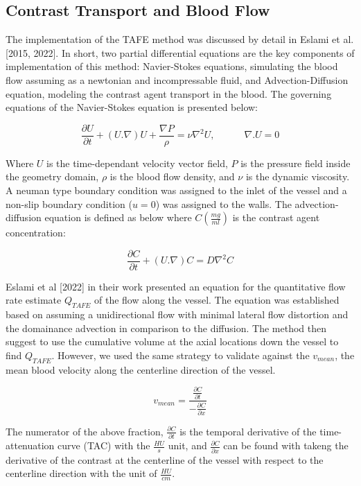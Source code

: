 \documentclass[times,twocolumn,final]{elsarticle}
\begin{document}
\subsection{Contrast Transport and Blood Flow}
The implementation of the TAFE method was discussed by detail in Eslami et al. [2015, 2022]. In short, two partial differential equations are the key components of implementation of this method: Navier-Stokes equations, simulating the blood flow assuming as a newtonian and incompressable fluid, and Advection-Diffusion equation, modeling the contrast agent transport in the blood. The governing equations of the Navier-Stokes equation is presented below:

\begin{equation}
\dfrac{\partial U}{\partial t} + (U. \nabla)U + \dfrac{\nabla P}{\rho} = \nu \nabla^2U,\quad \quad \quad \nabla.U=0
\end{equation}

Where $U$ is the time-dependant velocity vector field, $P$ is the pressure field inside the geometry domain, $\rho$ is the blood flow density, and $\nu$ is the dynamic viscosity. A neuman type boundary condition was assigned to the inlet of the vessel and a non-slip boundary condition ($u=0$) was assigned to the walls. The advection-diffusion equation is defined as below where $C(\frac{mg}{ml})$ is the contrast agent concentration: 

\begin{equation}
\dfrac{\partial C}{\partial t} + (U.\nabla )C = D\nabla ^2C
\end{equation}

Eslami et al [2022] in their work presented an equation for the quantitative flow rate estimate $Q_{TAFE}$ of the flow along the vessel. The equation was established based on assuming a unidirectional flow with minimal lateral flow distortion and the domainance advection in comparison to the diffusion. The method then suggest to use the cumulative volume at the axial locations down the vessel to find $Q_{TAFE}$. However, we used the same strategy to validate against the $v_{mean}$, the mean blood velocity along the centerline direction of the vessel.

\begin{equation}
v_{mean} = \dfrac{\frac{\partial C}{\partial t}}{-\frac{\partial C}{\partial x}}
\end{equation}

The numerator of the above fraction, $\frac{\partial C}{\partial t}$ is the temporal derivative of the time-attenuation curve (TAC) with the $\frac{HU}{s}$ unit, and $\frac{\partial C}{\partial x}$ can be found with takeng the derivative of the contrast at the centerline of the vessel with respect to the centerline direction with the unit of $\frac{HU}{cm}$.
\end{document}
